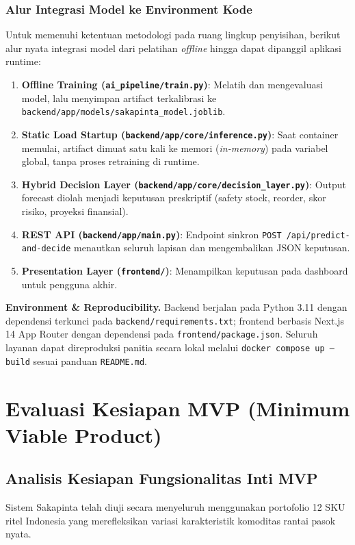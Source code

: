\documentclass[12pt,a4paper]{article}
\begin{document}
\subsubsection{Alur Integrasi Model ke Environment Kode}
Untuk memenuhi ketentuan metodologi pada ruang lingkup penyisihan, berikut alur nyata integrasi model dari pelatihan \textit{offline} hingga dapat dipanggil aplikasi runtime:
\begin{enumerate}
    \item \textbf{Offline Training (\texttt{ai\_pipeline/train.py})}: Melatih dan mengevaluasi model, lalu menyimpan artifact terkalibrasi ke \texttt{backend/app/models/sakapinta\_model.joblib}.
    \item \textbf{Static Load Startup (\texttt{backend/app/core/inference.py})}: Saat container memulai, artifact dimuat satu kali ke memori (\textit{in-memory}) pada variabel global, tanpa proses retraining di runtime.
    \item \textbf{Hybrid Decision Layer (\texttt{backend/app/core/decision\_layer.py})}: Output forecast diolah menjadi keputusan preskriptif (safety stock, reorder, skor risiko, proyeksi finansial).
    \item \textbf{REST API (\texttt{backend/app/main.py})}: Endpoint sinkron \texttt{POST /api/predict-and-decide} menautkan seluruh lapisan dan mengembalikan JSON keputusan.
    \item \textbf{Presentation Layer (\texttt{frontend/})}: Menampilkan keputusan pada dashboard untuk pengguna akhir.
\end{enumerate}
\textbf{Environment \& Reproducibility.} Backend berjalan pada Python 3.11 dengan dependensi terkunci pada \texttt{backend/requirements.txt}; frontend berbasis Next.js 14 App Router dengan dependensi pada \texttt{frontend/package.json}. Seluruh layanan dapat direproduksi panitia secara lokal melalui \texttt{docker compose up --build} sesuai panduan \texttt{README.md}.

\section{Evaluasi Kesiapan MVP (Minimum Viable Product)}

\subsection{Analisis Kesiapan Fungsionalitas Inti MVP}
Sistem Sakapinta telah diuji secara menyeluruh menggunakan portofolio 12 SKU ritel Indonesia yang merefleksikan variasi karakteristik komoditas rantai pasok nyata.
\end{document}

